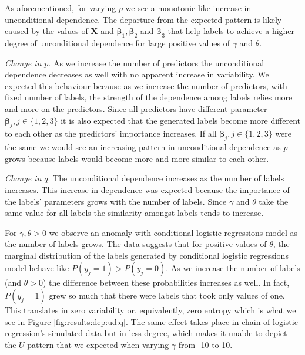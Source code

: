 \documentclass[review]{elsarticle}
\begin{document}
		As aforementioned, for varying $p$ we see a monotonic-like increase in unconditional dependence. The departure from the expected pattern is likely caused by the values of \textbf{X} and $\bm{\beta}_{1}, \bm{\beta}_{2}$ and $\bm{\beta}_{3}$ that help labels to achieve a higher degree of unconditional dependence for large positive values of $\gamma$ and $\theta$.
		
		
		
		\emph{Change in $p$}. As we increase the number of predictors the unconditional dependence decreases as well with no apparent increase in variability. We expected this behaviour because as we increase the number of predictors, with fixed number of labels, the strength of the dependence among labels relies more and more on the predictors. Since all predictors have different parameter $\bm{\beta}_{j}, j \in \{ 1,2,3 \}$ it is also expected that the generated labels become more different to each other as the predictors' importance increases. If all $\bm{\beta}_{j}, j \in \{ 1,2,3 \}$ were the same we would see an increasing pattern in unconditional dependence as $p$ grows because labels would become more and more similar to each other.
		
		\emph{Change in $q$}. The unconditional dependence increases as the number of labels increases. This increase in dependence was expected because the importance of the labels' parameters grows with the number of labels. Since $\gamma$ and $\theta$ take the same value for all labels the similarity amongst labels tends to increase. 
		
		For $\gamma, \theta > 0$ we observe an anomaly with conditional logistic regressions model as the number of labels grows. The data suggests that for positive values of $\theta$, the marginal distribution of the labels generated by conditional logistic regressions model behave like $P(y_{j}=1) > P(y_{j}=0)$. As we increase the number of labels (and $\theta > 0$) the difference between these probabilities increases as well. In fact, $P(y_{j}=1)$ grew so much that there were labels that took only values of one. This translates in zero variability or, equivalently, zero entropy which is what we see in Figure \ref{fig:results:dep:ud:q}. The same effect takes place in chain of logistic regression's simulated data but in less degree, which makes it unable to depict the $U$-pattern that we expected when varying $\gamma$ from -10 to 10.
		
\end{document}
